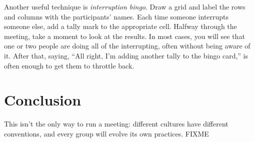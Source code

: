 \documentclass[10pt,letterpaper]{article}
\begin{document}
Another useful technique is \emph{interruption bingo}. Draw a grid and label
the rows and columns with the participants' names. Each time someone interrupts
someone else, add a tally mark to the appropriate cell. Halfway through the
meeting, take a moment to look at the results.  In most cases, you will see that
one or two people are doing all of the interrupting, often without being aware
of it. After that, saying, ``All right, I'm adding another tally to the bingo
card,'' is often enough to get them to throttle back.

\section*{Conclusion}

This isn't the only way to run a meeting: different cultures have different
conventions, and every group will evolve its own practices.  FIXME


\end{document}
